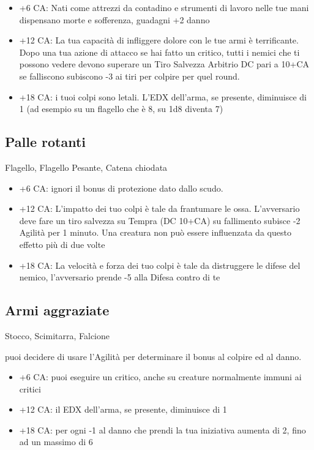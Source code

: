 \documentclass[a4paper,11pt,twoside,openany]{book}
\begin{document}
\begin{itemize}
	\item +6 CA: Nati come attrezzi da contadino e strumenti di lavoro nelle tue mani dispensano morte e sofferenza, guadagni +2 danno

	\item +12 CA: La tua capacità di infliggere dolore con le tue armi è terrificante. Dopo una tua azione di attacco se hai fatto un critico, tutti i nemici che ti possono vedere devono superare un Tiro Salvezza Arbitrio DC pari a 10+CA se falliscono subiscono -3 ai tiri per colpire per quel round.

	\item +18 CA: i tuoi colpi sono letali. L'EDX dell'arma, se presente, diminuisce di 1 (ad esempio su un flagello che è 8, su 1d8 diventa 7)
\end{itemize}

\subsection{Palle rotanti} Flagello, Flagello Pesante, Catena chiodata

\begin{itemize}
	\item +6 CA: ignori il bonus di protezione dato dallo scudo.

	\item +12 CA: L'impatto dei tuo colpi è tale da frantumare le ossa. L'avversario deve fare un tiro salvezza su Tempra (DC 10+CA) su fallimento subisce -2 Agilità per 1 minuto. Una creatura non può essere influenzata da questo effetto più di due volte

	\item +18 CA: La velocità e forza dei tuo colpi è tale da distruggere le difese del nemico, l'avversario prende -5 alla Difesa contro di te
\end{itemize}

\subsection{Armi aggraziate} Stocco, Scimitarra, Falcione

puoi decidere di usare l'Agilità per determinare il bonus al colpire
ed al danno.

\begin{itemize}
	\item +6 CA: puoi eseguire un critico, anche su creature normalmente immuni
	      ai critici

	\item +12 CA: il EDX dell'arma, se presente, diminuisce di 1

	\item +18 CA: per ogni -1 al danno che prendi la tua iniziativa aumenta di 2, fino ad un massimo di 6
\end{itemize}
\end{document}
